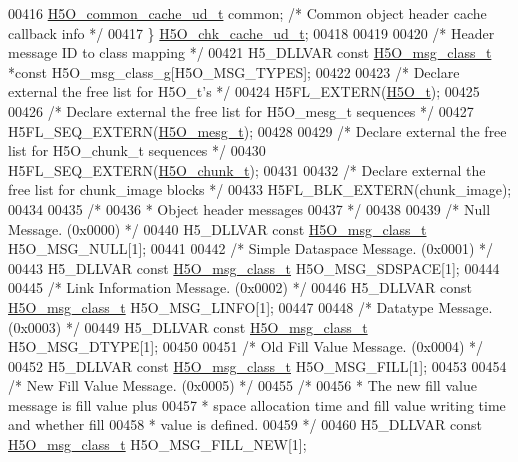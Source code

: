 \begin{DoxyCode}
00416     \hyperlink{struct_h5_o__common__cache__ud__t}{H5O\_common\_cache\_ud\_t} common;       \textcolor{comment}{/* Common object header cache callback info */}
00417 \} \hyperlink{struct_h5_o__chk__cache__ud__t}{H5O\_chk\_cache\_ud\_t};
00418 
00419 
00420 \textcolor{comment}{/* Header message ID to class mapping */}
00421 H5\_DLLVAR \textcolor{keyword}{const} \hyperlink{struct_h5_o__msg__class__t}{H5O\_msg\_class\_t} *\textcolor{keyword}{const} H5O\_msg\_class\_g[H5O\_MSG\_TYPES];
00422 
00423 \textcolor{comment}{/* Declare external the free list for H5O\_t's */}
00424 H5FL\_EXTERN(\hyperlink{struct_h5_o__t}{H5O\_t});
00425 
00426 \textcolor{comment}{/* Declare external the free list for H5O\_mesg\_t sequences */}
00427 H5FL\_SEQ\_EXTERN(\hyperlink{struct_h5_o__mesg__t}{H5O\_mesg\_t});
00428 
00429 \textcolor{comment}{/* Declare external the free list for H5O\_chunk\_t sequences */}
00430 H5FL\_SEQ\_EXTERN(\hyperlink{struct_h5_o__chunk__t}{H5O\_chunk\_t});
00431 
00432 \textcolor{comment}{/* Declare external the free list for chunk\_image blocks */}
00433 H5FL\_BLK\_EXTERN(chunk\_image);
00434 
00435 \textcolor{comment}{/*}
00436 \textcolor{comment}{ * Object header messages}
00437 \textcolor{comment}{ */}
00438 
00439 \textcolor{comment}{/* Null Message. (0x0000) */}
00440 H5\_DLLVAR \textcolor{keyword}{const} \hyperlink{struct_h5_o__msg__class__t}{H5O\_msg\_class\_t} H5O\_MSG\_NULL[1];
00441 
00442 \textcolor{comment}{/* Simple Dataspace Message. (0x0001) */}
00443 H5\_DLLVAR \textcolor{keyword}{const} \hyperlink{struct_h5_o__msg__class__t}{H5O\_msg\_class\_t} H5O\_MSG\_SDSPACE[1];
00444 
00445 \textcolor{comment}{/* Link Information Message. (0x0002) */}
00446 H5\_DLLVAR \textcolor{keyword}{const} \hyperlink{struct_h5_o__msg__class__t}{H5O\_msg\_class\_t} H5O\_MSG\_LINFO[1];
00447 
00448 \textcolor{comment}{/* Datatype Message. (0x0003) */}
00449 H5\_DLLVAR \textcolor{keyword}{const} \hyperlink{struct_h5_o__msg__class__t}{H5O\_msg\_class\_t} H5O\_MSG\_DTYPE[1];
00450 
00451 \textcolor{comment}{/* Old Fill Value Message. (0x0004) */}
00452 H5\_DLLVAR \textcolor{keyword}{const} \hyperlink{struct_h5_o__msg__class__t}{H5O\_msg\_class\_t} H5O\_MSG\_FILL[1];
00453 
00454 \textcolor{comment}{/* New Fill Value Message. (0x0005) */}
00455 \textcolor{comment}{/*}
00456 \textcolor{comment}{ * The new fill value message is fill value plus}
00457 \textcolor{comment}{ * space allocation time and fill value writing time and whether fill}
00458 \textcolor{comment}{ * value is defined.}
00459 \textcolor{comment}{ */}
00460 H5\_DLLVAR \textcolor{keyword}{const} \hyperlink{struct_h5_o__msg__class__t}{H5O\_msg\_class\_t} H5O\_MSG\_FILL\_NEW[1];

\end{DoxyCode}
